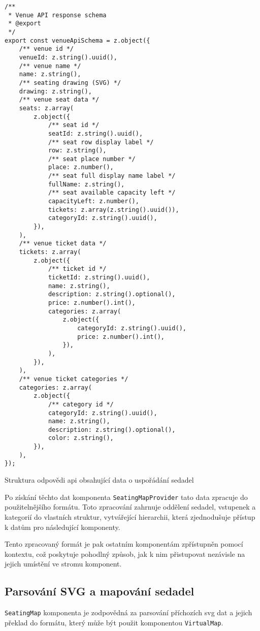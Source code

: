 \begin{listing}[!h]
\begin{verbatim}
/**
 * Venue API response schema
 * @export
 */
export const venueApiSchema = z.object({
	/** venue id */
	venueId: z.string().uuid(),
	/** venue name */
	name: z.string(),
	/** seating drawing (SVG) */
	drawing: z.string(),
	/** venue seat data */
	seats: z.array(
		z.object({
			/** seat id */
			seatId: z.string().uuid(),
			/** seat row display label */
			row: z.string(),
			/** seat place number */
			place: z.number(),
			/** seat full display name label */
			fullName: z.string(),
			/** seat available capacity left */
			capacityLeft: z.number(),
			tickets: z.array(z.string().uuid()),
			categoryId: z.string().uuid(),
		}),
	),
	/** venue ticket data */
	tickets: z.array(
		z.object({
			/** ticket id */
			ticketId: z.string().uuid(),
			name: z.string(),
			description: z.string().optional(),
			price: z.number().int(),
			categories: z.array(
				z.object({
					categoryId: z.string().uuid(),
					price: z.number().int(),
				}),
			),
		}),
	),
	/** venue ticket categories */
	categories: z.array(
		z.object({
			/** category id */
			categoryId: z.string().uuid(),
			name: z.string(),
			description: z.string().optional(),
			color: z.string(),
		}),
	),
});
\end{verbatim}
\caption{Struktura odpovědi \ac{api} obsahující data o uspořádání sedadel}
\label{listing:venue-api-schema}
\end{listing}

Po získání těchto dat komponenta \texttt{SeatingMapProvider} tato data zpracuje do použitelnějšího formátu.
Toto zpracování zahrnuje oddělení sedadel, vstupenek a kategorií do vlastních struktur, vytvářející hierarchii, která zjednodušuje přístup k datům pro následující komponenty.

Tento zpracovaný formát je pak ostatním komponentám zpřístupněn pomocí kontextu, což poskytuje pohodlný způsob, jak k nim přistupovat nezávisle na jejich umístění ve stromu komponent.

\subsection{Parsování SVG a mapování sedadel}
\label{subsec:implementace-seating-svg}
\texttt{SeatingMap} komponenta je zodpovědná za parsování příchozích \ac{svg} dat a jejich překlad do formátu, který může být použit komponentou \texttt{VirtualMap}.

